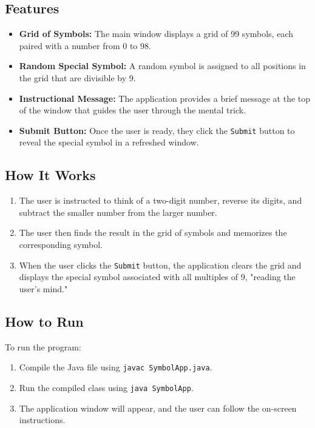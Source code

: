 \documentclass[a4paper,12pt]{article}
\begin{document}
\subsection{Features}
\begin{itemize}
    \item \textbf{Grid of Symbols:} The main window displays a grid of 99 symbols, each paired with a number from 0 to 98.
    \item \textbf{Random Special Symbol:} A random symbol is assigned to all positions in the grid that are divisible by 9.
    \item \textbf{Instructional Message:} The application provides a brief message at the top of the window that guides the user through the mental trick.
    \item \textbf{Submit Button:} Once the user is ready, they click the \texttt{Submit} button to reveal the special symbol in a refreshed window.
\end{itemize}

\subsection{How It Works}
\begin{enumerate}
    \item The user is instructed to think of a two-digit number, reverse its digits, and subtract the smaller number from the larger number.
    \item The user then finds the result in the grid of symbols and memorizes the corresponding symbol.
    \item When the user clicks the \texttt{Submit} button, the application clears the grid and displays the special symbol associated with all multiples of 9, "reading the user's mind."
\end{enumerate}

\subsection{How to Run}
To run the program:
\begin{enumerate}
    \item Compile the Java file using \texttt{javac SymbolApp.java}.
    \item Run the compiled class using \texttt{java SymbolApp}.
    \item The application window will appear, and the user can follow the on-screen instructions.
\end{enumerate}
\end{document}
